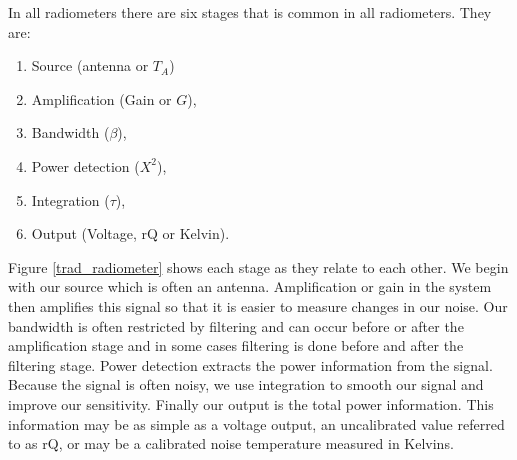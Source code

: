 
In all radiometers there are six stages that is common in all radiometers.  They are:

\begin{enumerate}
\item Source (antenna or $T_{A}$)
\item Amplification (Gain or $G$),
\item Bandwidth ($\beta$),
\item Power detection ($X^{2}$),
\item Integration ($\tau$),
\item Output (Voltage, rQ or Kelvin).
\end{enumerate}

Figure \ref{trad_radiometer} shows each stage as they relate to each other.  We begin with our source which is often an antenna.  Amplification or gain in the system then amplifies this signal so that it is easier to measure changes in our noise.  Our bandwidth is often restricted by filtering and can occur before or after the amplification stage and in some cases filtering is done before and after the filtering stage.  Power detection extracts the power information from the signal.  Because the signal is often noisy, we use integration to smooth our signal and improve our sensitivity.  Finally our output is the total power information.  This information may be as simple as a voltage output, an uncalibrated value referred to as rQ, or may be a calibrated noise temperature measured in Kelvins.

